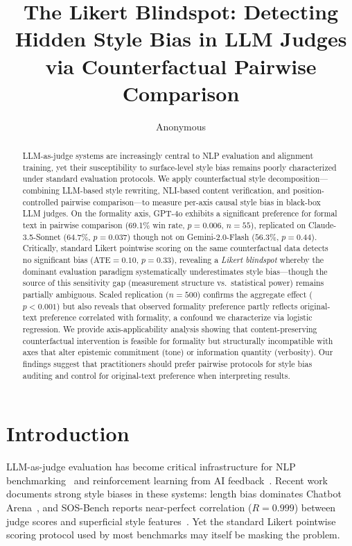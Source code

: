 \documentclass[11pt,a4paper]{article}
\title{The Likert Blindspot: Detecting Hidden Style Bias in LLM Judges\\via Counterfactual Pairwise Comparison}
\author{Anonymous}
\date{}
\begin{document}
\maketitle

\begin{abstract}
LLM-as-judge systems are increasingly central to NLP evaluation and alignment training, yet their susceptibility to surface-level style bias remains poorly characterized under standard evaluation protocols.
We apply counterfactual style decomposition---combining LLM-based style rewriting, NLI-based content verification, and position-controlled pairwise comparison---to measure per-axis causal style bias in black-box LLM judges.
On the formality axis, GPT-4o exhibits a significant preference for formal text in pairwise comparison (69.1\% win rate, $p=0.006$, $n=55$), replicated on Claude-3.5-Sonnet ($64.7\%$, $p=0.037$) though not on Gemini-2.0-Flash ($56.3\%$, $p=0.44$).
Critically, standard Likert pointwise scoring on the same counterfactual data detects no significant bias (ATE$=0.10$, $p=0.33$), revealing a \emph{Likert blindspot} whereby the dominant evaluation paradigm systematically underestimates style bias---though the source of this sensitivity gap (measurement structure vs.\ statistical power) remains partially ambiguous.
Scaled replication ($n=500$) confirms the aggregate effect ($p<0.001$) but also reveals that observed formality preference partly reflects original-text preference correlated with formality, a confound we characterize via logistic regression.
We provide axis-applicability analysis showing that content-preserving counterfactual intervention is feasible for formality but structurally incompatible with axes that alter epistemic commitment (tone) or information quantity (verbosity).
Our findings suggest that practitioners should prefer pairwise protocols for style bias auditing and control for original-text preference when interpreting results.
\end{abstract}

\section{Introduction}

LLM-as-judge evaluation has become critical infrastructure for NLP benchmarking~\citep{zheng2023judging,dubois2024alpacafarm} and reinforcement learning from AI feedback~\citep{bai2022constitutional,lee2023rlaif}.
Recent work documents strong style biases in these systems: length bias dominates Chatbot Arena~\citep{park2024disentangling}, and SOS-Bench reports near-perfect correlation ($R=0.999$) between judge scores and superficial style features~\citep{sosbench2025}.
Yet the standard Likert pointwise scoring protocol used by most benchmarks may itself be masking the problem.
\end{document}
